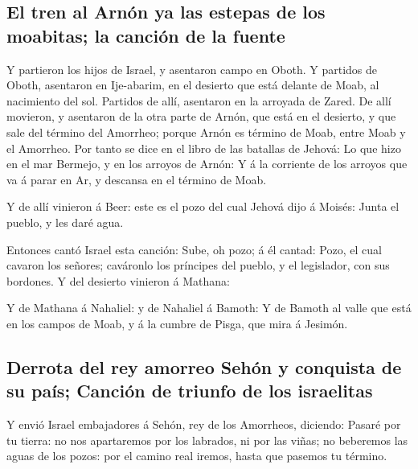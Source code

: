 \hypertarget{el-tren-al-arnuxf3n-ya-las-estepas-de-los-moabitas-la-canciuxf3n-de-la-fuente}{%
\subsection{El tren al Arnón ya las estepas de los moabitas; la canción
de la
fuente}\label{el-tren-al-arnuxf3n-ya-las-estepas-de-los-moabitas-la-canciuxf3n-de-la-fuente}}

 Y partieron los hijos de Israel, y asentaron campo en
Oboth.  Y partidos de Oboth, asentaron en Ije-abarim, en
el desierto que está delante de Moab, al nacimiento del sol.
 Partidos de allí, asentaron en la arroyada de Zared.
 De allí movieron, y asentaron de la otra parte de Arnón,
que está en el desierto, y que sale del término del Amorrheo; porque
Arnón es término de Moab, entre Moab y el Amorrheo.  Por
tanto se dice en el libro de las batallas de Jehová: Lo que hizo en el
mar Bermejo, y en los arroyos de Arnón:  Y á la corriente
de los arroyos que va á parar en Ar, y descansa en el término de Moab.

 Y de allí vinieron á Beer: este es el pozo del cual
Jehová dijo á Moisés: Junta el pueblo, y les daré agua.

 Entonces cantó Israel esta canción: Sube, oh pozo; á él
cantad:  Pozo, el cual cavaron los señores; caváronlo los
príncipes del pueblo, y el legislador, con sus bordones. Y del desierto
vinieron á Mathana:

 Y de Mathana á Nahaliel: y de Nahaliel á Bamoth:
 Y de Bamoth al valle que está en los campos de Moab, y á
la cumbre de Pisga, que mira á Jesimón.

\hypertarget{derrota-del-rey-amorreo-sehuxf3n-y-conquista-de-su-pauxeds-canciuxf3n-de-triunfo-de-los-israelitas}{%
\subsection{Derrota del rey amorreo Sehón y conquista de su país;
Canción de triunfo de los
israelitas}\label{derrota-del-rey-amorreo-sehuxf3n-y-conquista-de-su-pauxeds-canciuxf3n-de-triunfo-de-los-israelitas}}

 Y envió Israel embajadores á Sehón, rey de los
Amorrheos, diciendo:  Pasaré por tu tierra: no nos
apartaremos por los labrados, ni por las viñas; no beberemos las aguas
de los pozos: por el camino real iremos, hasta que pasemos tu término.

